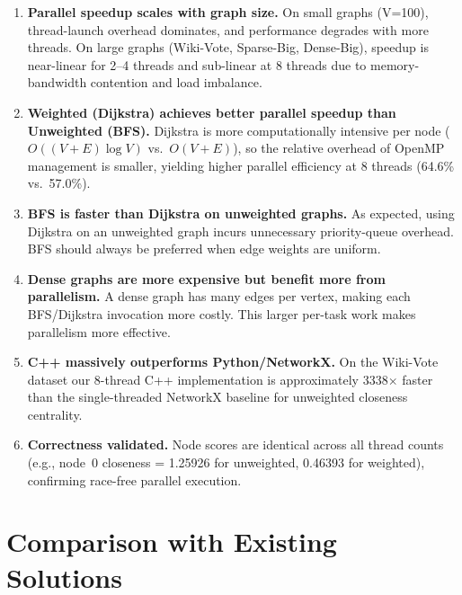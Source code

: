 \documentclass[12pt,a4paper]{article}
\begin{document}
\begin{enumerate}
  \item \textbf{Parallel speedup scales with graph size.}  On small graphs (V=100),
        thread-launch overhead dominates, and performance degrades with more threads.  On
        large graphs (Wiki-Vote, Sparse-Big, Dense-Big), speedup is near-linear for
        2--4 threads and sub-linear at 8 threads due to memory-bandwidth contention and
        load imbalance.

  \item \textbf{Weighted (Dijkstra) achieves better parallel speedup than Unweighted
        (BFS).}  Dijkstra is more computationally intensive per node ($O((V+E)\log V)$ vs.\
        $O(V+E)$), so the relative overhead of OpenMP management is smaller, yielding
        higher parallel efficiency at 8 threads (64.6\% vs.\ 57.0\%).

  \item \textbf{BFS is faster than Dijkstra on unweighted graphs.}  As expected, using
        Dijkstra on an unweighted graph incurs unnecessary priority-queue overhead.  BFS
        should always be preferred when edge weights are uniform.

  \item \textbf{Dense graphs are more expensive but benefit more from parallelism.}
        A dense graph has many edges per vertex, making each BFS/Dijkstra invocation more
        costly.  This larger per-task work makes parallelism more effective.

  \item \textbf{C++ massively outperforms Python/NetworkX.}  On the Wiki-Vote dataset our
        8-thread C++ implementation is approximately 3338$\times$ faster than the
        single-threaded NetworkX baseline for unweighted closeness centrality.

  \item \textbf{Correctness validated.}  Node scores are identical across all thread counts
        (e.g., node~0 closeness = 1.25926 for unweighted, 0.46393 for weighted), confirming
        race-free parallel execution.
\end{enumerate}

\section{Comparison with Existing Solutions}
\label{sec:comparison}
\end{document}
